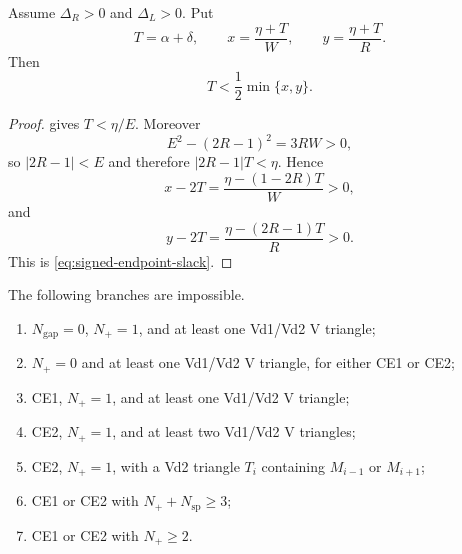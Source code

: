 \begin{lemma}
\label{lem:signed-endpoints-dominate-slack}
Assume $\Delta_R>0$ and $\Delta_L>0$. Put
\[
 T=\alpha+\delta,
 \qquad
 x=\frac{\eta+T}{W},
 \qquad
 y=\frac{\eta+T}{R}.
\]
Then
\begin{equation}
 \boxed{T<\frac12\min\{x,y\}.}
 \label{eq:signed-endpoint-slack}
\end{equation}
\end{lemma}

\begin{proof}
 gives $T<\eta/E$. Moreover
\[
 E^2-(2R-1)^2=3RW>0,
\]
so $|2R-1|<E$ and therefore $|2R-1|T<\eta$. Hence
\[
 x-2T=\frac{\eta-(1-2R)T}{W}>0,
\]
and
\[
 y-2T=\frac{\eta-(2R-1)T}{R}>0.
\]
This is \eqref{eq:signed-endpoint-slack}.
\end{proof}

\begin{corollary}
\label{cor:signed-budget-branches}
The following branches are impossible.
\begin{enumerate}
\item $N_{\mathrm{gap}}=0$, $N_+=1$, and at least one Vd1/Vd2 V triangle;
\item $N_+=0$ and at least one Vd1/Vd2 V triangle, for either CE1 or CE2;
\item CE1, $N_+=1$, and at least one Vd1/Vd2 V triangle;
\item CE2, $N_+=1$, and at least two Vd1/Vd2 V triangles;
\item CE2, $N_+=1$, with a Vd2 triangle $T_i$ containing $M_{i-1}$ or
$M_{i+1}$;
\item CE1 or CE2 with $N_++N_{\mathrm{sp}}\ge3$;
\item CE1 or CE2 with $N_+\ge2$.
\end{enumerate}
\end{corollary}

